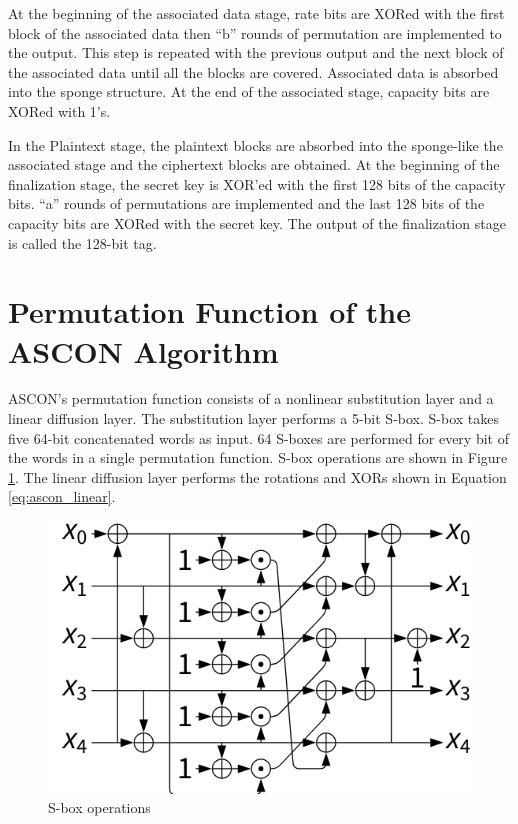 At the beginning of the associated data stage, rate bits are XORed with the first block of the associated data then “b” rounds of permutation are implemented to the output. This step is repeated with the previous output and the next block of the associated data until all the blocks are covered. Associated data is absorbed into the sponge structure. At the end of the associated stage, capacity bits are XORed with 1’s.

In the Plaintext stage, the plaintext blocks are absorbed into the sponge-like the associated stage and the ciphertext blocks are obtained. At the beginning of the finalization stage, the secret key is XOR'ed with the first 128 bits of the capacity bits. “a” rounds of permutations are implemented and the last 128 bits of the capacity bits are XORed with the secret key. The output of the finalization stage is called the 128-bit tag. 

\section{Permutation Function of the ASCON Algorithm}


ASCON’s permutation function consists of a nonlinear substitution layer and a linear diffusion layer. The substitution layer performs a 5-bit S-box. S-box takes five 64-bit concatenated words as input. 64 S-boxes are performed for every bit of the words in a single permutation function. S-box operations are shown in Figure \ref{fig:sbox_operations}. The linear diffusion layer performs the rotations and XORs shown in Equation \ref{eq:ascon_linear}.

\begin{figure}
    \centering
    \includegraphics[scale = 0.6]{ascon_sbox/s_box_ascon.png}
    \caption{S-box operations}
    \label{fig:sbox_operations}
\end{figure}

